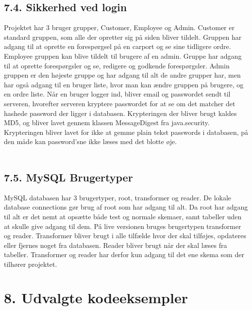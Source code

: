 \documentclass[11pt]{report}
\begin{document}
\section*{7.4. Sikkerhed ved login}
Projektet har 3 bruger grupper, Customer, Employee og Admin. Customer
er standard gruppen, som alle der opretter sig på siden bliver
tildelt. Gruppen har adgang til at oprette en forespørgsel på en
carport og se sine tidligere ordre. Employee gruppen kan blive tildelt
til brugere af en admin. Gruppe har adgang til at oprette
forespørgsler og se, redigere og godkende forespørgsler. Admin gruppen
er den højeste gruppe og har adgang til alt de andre grupper har, men
har også adgang til en bruger liste, hvor man kan ændre gruppen på
brugere, og en ordre liste. Når en bruger logger ind, bliver email og
passwordet sendt til serveren, hvorefter serveren kryptere passwordet
for at se om det matcher det hashede password der ligger i
databasen. Krypteringen der bliver brugt kaldes MD5, og bliver lavet
gennem klassen MessageDigest fra java.security. Krypteringen bliver
lavet for ikke at gemme plain tekst passwords i databasen, på den måde
kan password’sne ikke læses med det blotte øje. \\\\

\section*{7.5. MySQL Brugertyper}
MySQL databasen har 3 brugertyper, root, transformer og reader. De lokale database connections gør brug af root som har adgang til alt. Da root har adgang til alt er det nemt at opsætte både test og normale skemaer, samt tabeller uden at skulle give adgang til dem. På live versionen bruges brugertypen transformer og reader. Transformer bliver brugt i alle tilfælde hvor der skal tilføjes, opdateres eller fjernes noget fra databasen. Reader bliver brugt når der skal læses fra tabeller. Transformer og reader har derfor kun adgang til det ene skema som der tilhører projektet.
\newpage

\chapter*{8. Udvalgte kodeeksempler}
\end{document}
